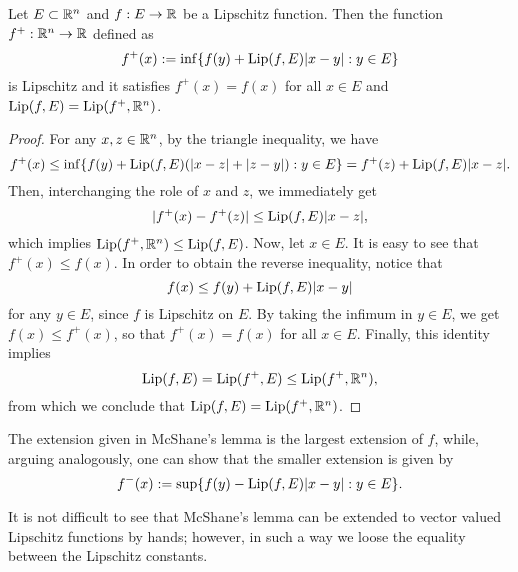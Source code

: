 \begin{lemma} \label{McShane_lemma}
Let $E \subset \mathbb{R}^{n}$ and $f: E \to \mathbb{R}$ be a Lipschitz function. Then the function $f^{+} : \mathbb{R}^{n} \to \mathbb{R}$ defined as
\begin{equation*}
f^{+}(x) := \inf \{ f(y) + \operatorname{Lip}(f, E) |x - y| : y \in E\}
\end{equation*}
is Lipschitz and it satisfies $f^{+}(x) = f(x)$ for all $x \in E$ and $\operatorname{Lip}(f, E) = \operatorname{Lip}(f^{+}, \mathbb{R}^{n})$.
\end{lemma}
\begin{proof}
For any $x, z \in \mathbb{R}^{n}$, by the triangle inequality, we have
\begin{equation*}
f^{+}(x) \le \inf \{ f(y) + \operatorname{Lip}(f, E) (|x - z| + |z - y|) : y \in E \} = f^{+}(z) + \operatorname{Lip}(f, E) |x - z|.
\end{equation*}
Then, interchanging the role of $x$ and $z$, we immediately get
\begin{equation*}
|f^{+}(x) - f^{+}(z)| \le \operatorname{Lip}(f, E) |x - z|,
\end{equation*}
which implies $\operatorname{Lip}(f^{+}, \mathbb{R}^{n}) \le \operatorname{Lip}(f, E)$.
Now, let $x \in E$. It is easy to see that $f^{+}(x) \le f(x)$. In order to obtain the reverse inequality, notice that 
\begin{equation*}
f(x) \le f(y) + \operatorname{Lip}(f, E)|x - y|
\end{equation*}
for any $y \in E$, since $f$ is Lipschitz on $E$. By taking the infimum in $y \in E$, we get $f(x) \le f^{+}(x)$, so that $f^{+}(x) = f(x)$ for all $x \in E$. Finally, this identity implies
\begin{equation*}
\operatorname{Lip}(f, E) = \operatorname{Lip}(f^{+}, E) \le \operatorname{Lip}(f^{+}, \mathbb{R}^{n}),
\end{equation*}
from which we conclude that $\operatorname{Lip}(f, E) = \operatorname{Lip}(f^{+}, \mathbb{R}^{n})$.
\end{proof}

\begin{remark} The extension given in McShane's lemma is the largest extension of $f$, while, arguing analogously, one can show that the smaller extension is given by
\begin{equation*}
f^{-}(x) := \sup \{ f(y) - \operatorname{Lip}(f, E) |x - y| : y \in E \}.
\end{equation*}
\end{remark}

It is not difficult to see that McShane's lemma can be extended to vector valued Lipschitz functions by hands; however, in such a way we loose the equality between the Lipschitz constants.

